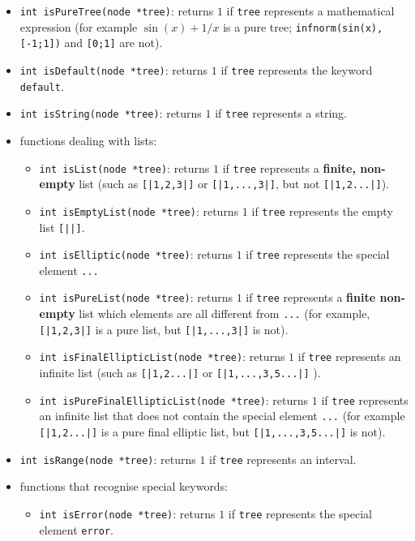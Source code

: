 \documentclass{article}
\begin{document}
\begin{itemize}
\item \texttt{int isPureTree(node *tree)}: returns $1$ if \texttt{tree} represents a mathematical expression (for example $\sin(x)+1/x$ is a pure tree; \texttt{infnorm(sin(x),[-1;1])} and \texttt{[0;1]} are not).
\item \texttt{int isDefault(node *tree)}: returns $1$ if \texttt{tree} represents the keyword \texttt{default}.
\item \texttt{int isString(node *tree)}: returns $1$ if \texttt{tree} represents a string.

\item functions dealing with lists:
  \begin{itemize}
  \item \texttt{int isList(node *tree)}: returns $1$ if \texttt{tree} represents a \textbf{finite, non-empty} list (such as \texttt{[|1,2,3|]} or \texttt{[|1,...,3|]}, but not \texttt{[|1,2...|]}).
  \item \texttt{int isEmptyList(node *tree)}: returns $1$ if \texttt{tree} represents the empty list \texttt{[||]}.
  \item \texttt{int isElliptic(node *tree)}: returns $1$ if \texttt{tree} represents the special element \texttt{...}
  \item \texttt{int isPureList(node *tree)}: returns $1$ if \texttt{tree} represents a \textbf{finite non-empty} list which elements are all different from \texttt{...} (for example, \texttt{[|1,2,3|]} is a pure list, but \texttt{[|1,...,3|]} is not).
  \item \texttt{int isFinalEllipticList(node *tree)}: returns $1$ if \texttt{tree} represents an infinite list (such as \texttt{[|1,2...|]} or \texttt{[|1,...,3,5...|]} ).
  \item \texttt{int isPureFinalEllipticList(node *tree)}: returns $1$ if \texttt{tree} represents an infinite list that does not contain the special element \texttt{...} (for example \texttt{[|1,2...|]} is a pure final elliptic list, but \texttt{[|1,...,3,5...|]} is not).
  \end{itemize}
\item \texttt{int isRange(node *tree)}: returns $1$ if \texttt{tree} represents an interval.
\item functions that recognise special keywords:
  \begin{itemize}
  \item \texttt{int isError(node *tree)}: returns $1$ if \texttt{tree}
    represents the special element \texttt{error}.

\end{itemize}
\end{itemize}
\end{document}
